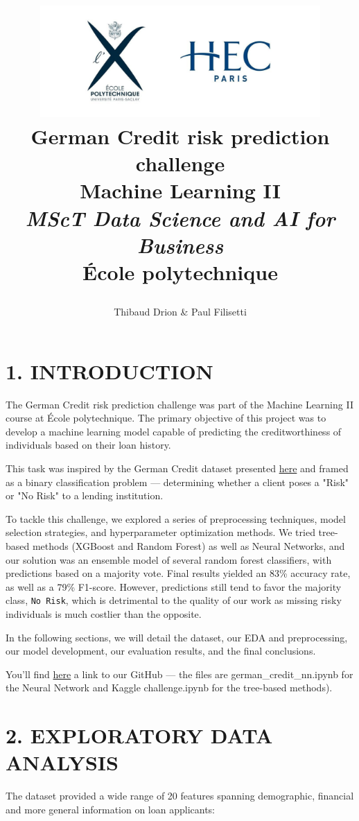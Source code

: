 \documentclass[12pt]{report}
\title{\includegraphics[width=0.8\textwidth]{xhec.jpg}\\
       \Large \textbf{German Credit risk prediction challenge}\\
       \Large \textbf{Machine Learning II}\\[2em]
       \large \textit{MScT Data Science and AI for Business}\\
       \large École polytechnique
       \date{}
       \author{Thibaud Drion \& Paul Filisetti}}
\begin{document}
\maketitle
\newpage

\section*{1. INTRODUCTION}

The German Credit risk prediction challenge was part of the Machine Learning II course at École polytechnique. The primary objective of this project was to develop a machine learning model capable of predicting the creditworthiness of individuals based on their loan history.

This task was inspired by the German Credit dataset presented \href{https://archive.ics.uci.edu/dataset/144/statlog+german+credit+data}{here} and framed as a binary classification problem — determining whether a client poses a "Risk" or "No Risk" to a lending institution.

To tackle this challenge, we explored a series of preprocessing techniques, model selection strategies, and hyperparameter optimization methods. We tried tree-based methods (XGBoost and Random Forest) as well as Neural Networks, and our solution was an ensemble model of several random forest classifiers, with predictions based on a majority vote. Final results yielded an 83\% accuracy rate, as well as a 79\% F1-score. However, predictions still tend to favor the majority class, \texttt{No Risk}, which is detrimental to the quality of our work as missing risky individuals is much costlier than the opposite.

In the following sections, we will detail the dataset, our EDA and preprocessing, our model development, our evaluation results, and the final conclusions.

You'll find \href{https://github.com/Thibaud001/German-Credit-scoring}{here} a link to our GitHub — the files are german\_credit\_nn.ipynb for the Neural Network and Kaggle challenge.ipynb for the tree-based methods).

\section*{2. EXPLORATORY DATA ANALYSIS}

The dataset provided a wide range of 20 features spanning demographic, financial and more general information on loan applicants:
\end{document}
